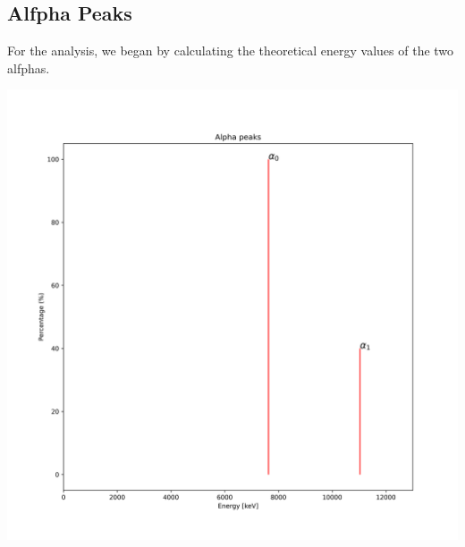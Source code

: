 \documentclass{article}
\begin{document}
\begin{multicols}{2}
%
%
%
%
%
%
\section{Alfpha Peaks}
For the analysis, we began by calculating the theoretical energy values of the two alfphas. 

\begin{center}
    \label{alfa_peaks}
    \centering
    \includegraphics[scale = 0.35]{../../images/AlphaPeaks.png}
\end{center}


\end{multicols}
\end{document}
